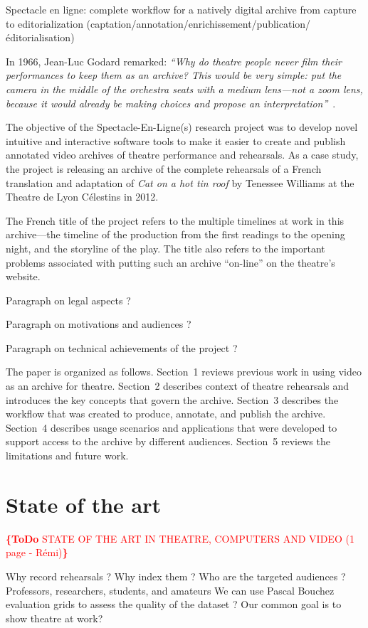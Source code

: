 \documentclass[conference]{IEEEtran}
\newcommand{\todo}[1]{\noindent\textcolor{red}{{\bf \{ToDo} #1{\bf \}}}}
\begin{document}
Spectacle en ligne: complete workflow for a natively digital archive from capture to editorialization
(captation/annotation/enrichissement/publication/éditorialisation)

In 1966, Jean-Luc Godard remarked: {\em ``Why do theatre people never film their performances to keep  them as an archive? This would be very simple: put the camera in the middle of the orchestra seats with a medium lens---not a zoom lens, because it would already be making choices and propose an interpretation''}~\cite{Godard66}.

The objective of the Spectacle-En-Ligne(s) research project was to develop novel intuitive and interactive software tools to make it easier to 
create and publish annotated video archives of theatre performance and rehearsals. As a case study, the project is releasing an archive of 
the complete rehearsals of a French translation and adaptation of \emph{Cat on a hot tin roof} by Tenessee Williams at the Theatre de Lyon Célestins
in 2012. 

The French title of the project refers to the multiple timelines at work in this archive---the timeline of the production from the first readings to the opening night, and the storyline of the play. The title also refers to the important problems associated with putting such an archive ``on-line'' on the theatre's website.

Paragraph on legal aspects ? 

Paragraph on motivations and audiences ? 

Paragraph on technical achievements of the project ?

The paper is organized as follows. Section~1 reviews previous work in using video as an archive for theatre. Section~2 describes
context of theatre rehearsals and introduces the key concepts that govern the archive. Section~3 describes the workflow that was
created to produce, annotate, and publish the archive. Section~4 describes usage scenarios and applications that were developed
to support access to the archive by different audiences. Section~5 reviews the limitations and future work.



\section{State of the art}
\todo{STATE OF THE ART IN THEATRE, COMPUTERS AND VIDEO (1 page - Rémi)}

Why record rehearsals ?
Why index them ?
Who are the targeted audiences ? Professors, researchers, students, and amateurs
We can use Pascal Bouchez evaluation grids to assess the quality of the dataset ?
Our common goal is to show theatre at work?
\end{document}

